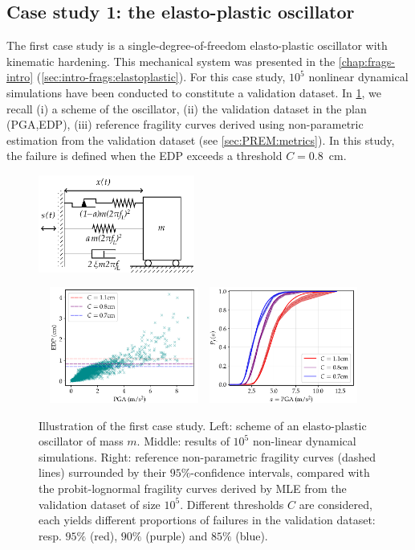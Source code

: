 \subsection{Case study 1: the elasto-plastic oscillator}


The first case study is a single-degree-of-freedom elasto-plastic oscillator
with kinematic hardening. This mechanical system was presented in the \cref{chap:frags-intro} (\cref{sec:intro-frags:elastoplastic}).
For this case study, $10^5$ nonlinear dynamical simulations have been conducted to constitute a validation dataset.
In \cref{fig:PREM:oscill}, we recall (i) a scheme of the oscillator, (ii) the validation dataset in the plan (PGA,EDP), (iii) reference fragility curves derived using non-parametric estimation from the validation dataset (see \cref{sec:PREM:metrics}).
In this study, the failure is defined when the EDP exceeds a threshold $C=0.8$~cm.

\begin{figure}[h]
    \centering
    \parbox[b][3.8cm][t]{5.2cm}{
        \includegraphics[height=3.2cm]{figures/intro-frags/KBEPO_rheo.pdf}}\ \ 
    \includegraphics[height=3.8cm]{figures/intro-frags/oscill/cloudPGA.pdf}\ \ 
    \includegraphics[height=3.8cm]{figures/intro-frags/oscill/refs_PGA.pdf}
    \caption{Illustration of the first case study. Left: scheme of an elasto-plastic oscillator of mass $m$. Middle: results of $10^5$ non-linear dynamical simulations. Right: reference non-parametric fragility curves (dashed lines) surrounded by their $95\%$-confidence intervals, compared with the probit-lognormal fragility curves derived by MLE from the validation dataset of size $10^5$. Different thresholds $C$ are considered, each yields different proportions of failures in the validation dataset: resp. $95\%$ (red), $90\%$ (purple) and $85\%$ (blue).}
    \label{fig:PREM:oscill}
\end{figure}



